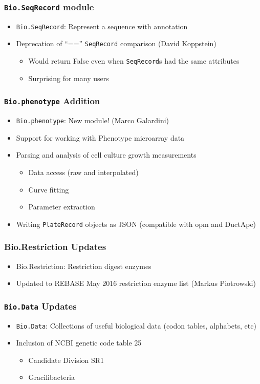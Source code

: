 \documentclass[trans]{beamer}
\begin{document}
\frame
{
  \frametitle{\texttt{Bio.SeqRecord} module}
  
  \begin{itemize}
  \item \texttt{Bio.SeqRecord}: Represent a sequence with annotation
  \item Deprecation of ``=='' \texttt{SeqRecord} comparison (David Koppstein)
  \begin{itemize}
  \item Would return False even when \texttt{SeqRecord}s had the same attributes
  \item Surprising for many users
  \end{itemize}
  \end{itemize}
}

\frame
{
  \frametitle{\texttt{Bio.phenotype} Addition}
  
  \begin{itemize}
  \item \texttt{Bio.phenotype}: New module! (Marco Galardini)
  \item Support for working with Phenotype microarray data
  \item Parsing and analysis of cell culture growth measurements
  \begin{itemize}
  \item Data access (raw and interpolated)
  \item Curve fitting
  \item Parameter extraction
  \end{itemize}
  \item Writing \texttt{PlateRecord} objects as JSON (compatible with opm and DuctApe)
  \end{itemize}
}

\frame
{
  \frametitle{Bio.Restriction Updates}
  
  \begin{itemize}
  \item Bio.Restriction: Restriction digest enzymes
  \item Updated to REBASE May 2016 restriction enzyme list (Markus Piotrowski)
  \end{itemize}
}

\frame
{
  \frametitle{\texttt{Bio.Data} Updates}
  
  \begin{itemize}
  \item \texttt{Bio.Data}: Collections of useful biological data (codon tables, alphabets, etc)
  \item Inclusion of NCBI genetic code table 25
  \begin{itemize}
  \item Candidate Division SR1
  \item Gracilibacteria
  \end{itemize}
  \end{itemize}
}
\end{document}
